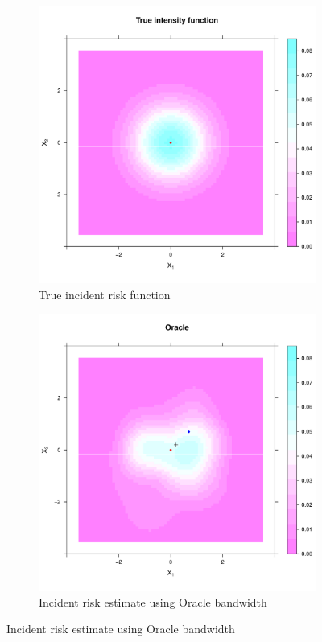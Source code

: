 \begin{figure}[htbp]
    \centering
    \begin{subfigure}[t]{0.45\textwidth}
    \includegraphics[width=\textwidth]{output/true_intensity_heatmap}
    \caption{True incident risk function}
    \end{subfigure}%
    \begin{subfigure}[t]{0.45\textwidth}
    \includegraphics[width=\textwidth]{output/oracle_intensity_heatmap}
    \caption{Incident risk estimate using Oracle bandwidth}
    \end{subfigure}



\end{figure}
